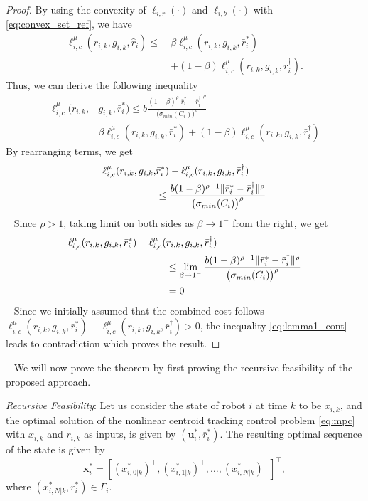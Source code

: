 \begin{proof}
By using the convexity of $\ell_{i,r}(\cdot)$ and $\ell_{i,b}(\cdot)$ with \eqref{eq:convex_set_ref}, we have
\begin{align}
     \ell_{i,c}^\mu(r_{i,k},g_{i,k},\hat{r}_i) \leq \ &\beta \ell_{i,c}^\mu(r_{i,k},g_{i,k},\bar{r}_i^*) \nonumber
     \\&+ (1-\beta)\ell_{i,c}^\mu(r_{i,k},g_{i,k},\bar{r}_i^\dagger).
\end{align}
Thus, we can derive the following inequality
\begin{align}
      \ell_{i,c}^\mu(r_{i,k},&g_{i,k},\bar{r}_i^*) \leq b \frac{(1-\beta)^\rho|\bar{r}_i^* - \bar{r}_i^\dagger|^\rho}{\bigl(\sigma_{min}(C_i)\bigr)^\rho} \nonumber
      \\&\beta \ell_{i,c}^\mu(r_{i,k},g_{i,k},\bar{r}_i^*) + (1-\beta)\ell_{i,c}^\mu(r_{i,k},g_{i,k},\bar{r}_i^\dagger)
\end{align}
By rearranging terms, we get
\begin{align}
      \ell_{i,c}^\mu(r_{i,k},g_{i,k},&\bar{r}_i^*) - \ell_{i,c}^\mu(r_{i,k},g_{i,k},\bar{r}_i^\dagger) \nonumber
      \\ &\leq \frac{b(1-\beta)^{\rho-1}\lVert\bar{r}_i^* - \bar{r}_i^\dagger\rVert^\rho}{\bigl(\sigma_{min}(C_i)\bigr)^\rho}
\end{align}~
Since $\rho>1$, taking limit on both sides as $\beta \rightarrow 1^-$ from the right, we get
\begin{align}
\label{eq:lemma1_cont}
      \ell_{i,c}^\mu(r_{i,k},g_{i,k},\bar{r}_i^*) - \ell_{i,c}^\mu(&r_{i,k},g_{i,k},\bar{r}_i^\dagger) \nonumber
      \\ &\leq \lim_{\beta\rightarrow1^-} \frac{b(1-\beta)^{\rho-1}\lVert\bar{r}_i^* - \bar{r}_i^\dagger\rVert^\rho}{\bigl(\sigma_{min}(C_i)\bigr)^\rho}\nonumber
       \\& = 0
\end{align}~
Since we initially assumed that the combined cost follows $\ell_{i,c}^\mu(r_{i,k},g_{i,k},\bar{r}_i^*) - \ell_{i,c}^\mu(r_{i,k},g_{i,k},\bar{r}_i^\dagger)>0$, the inequality \eqref{eq:lemma1_cont} leads to contradiction which proves the result.
\end{proof}~
We will now prove the theorem by first proving the recursive feasibility of the proposed approach.

\textit{Recursive Feasibility}: Let us consider the state of robot $i$ at time $k$ to be $x_{i,k}$, and the optimal solution of the nonlinear centroid tracking control problem \eqref{eq:mpc} with $x_{i,k}$ and $r_{i,k}$ as inputs, is given by $(\mathbf{u}_i^*, \bar{r}_i^*)$. The resulting optimal sequence of the state is given by
\begin{equation}
    \mathbf{x}_i^* = [(x_{i,0|k}^*)^\top, (x_{i,1|k}^*)^\top, \dots, (x_{i,N|k}^*)^\top]^\top,
\end{equation}
where $(x_{i,N|k}^*, \bar{r}_i^*) \in \Gamma_i$.

